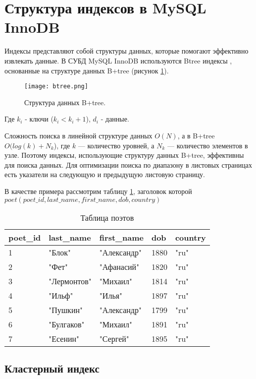 \section{Структура индексов в MySQL InnoDB}

Индексы представляют собой структуры данных, которые помогают эффективно извлекать данные.
В СУБД MySQL InnoDB используются Btree индексы \cite{dev.mysql.com:How_MySQL_Uses_Indexes}, основанные на структуре данных B+tree (рисунок \ref{img:btree-structure}).

\begin{figure}[H]
  \centering
  \texttt{[image: btree.png]}
  \caption{Структура данных B+tree.}
  \label{img:btree-structure}
\end{figure}

Где
$k_i$ - ключи ($k_i < k_i + 1$),
$d_i$ - данные.

Сложность поиска в линейной структуре данных $O(N)$, а в B+tree $O(log(k)+N_k$), где $k$ — количество уровней, а $N_k$ — количество элементов в узле. Поэтому индексы, использующие структуру данных B+tree, эффективны для поиска данных. Для оптимизации поиска по диапазону в листовых страницах есть указатели на следующую и предыдущую листовую страницу.

В качестве примера рассмотрим таблицу \ref{tabular:poets}, заголовок которой $poet (poet\_id, last\_name, first\_name, dob, country)$

\begin{table}[h]
\caption{Таблица поэтов}
\label{tabular:poets}
\medskip
\begin{tabular}{|l|l|l|l|l|}
\hline
poet\_id & last\_name & first\_name & dob & country\\
\hline
1 & "Блок" & "Александр" & 1880 & "ru"\\
2 & "Фет" & "Афанасий" & 1820 & "ru"\\
3 & "Лермонтов" & "Михаил" & 1814 & "ru"\\
4 & "Ильф" & "Илья" & 1897 & "ru"\\
5 & "Пушкин" & "Александр" & 1799 & "ru"\\
6 & "Булгаков" & "Михаил" & 1891 & "ru"\\
7 & "Есенин" & "Сергей" & 1895 & "ru"\\
\hline
\end{tabular}
\end{table}

\subsection{Кластерный индекс}

